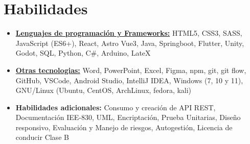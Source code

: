 \documentclass[11pt,a4paper,sans]{moderncv}
\newcommand{\sectionMargin}{-3mm}
\begin{document}
\section{Habilidades}{
    \begin{itemize}[label=\textbullet, noitemsep]
        \item {\underline{\textbf{Lenguajes de programación y Frameworks:}}
            {HTML5},
            {CSS3},
            {SASS},
            {JavaScript (ES6+)},
            {React},
            {Astro}
            {Vue3},
            {Java},
            {Springboot},
            {Flutter},
            {Unity},
            {Godot},
            {SQL},
            {Python},
            {C\#},
            {Arduino},
            {LateX}
        }
        
        \item {\underline{\textbf{Otras tecnologias:}}
            {Word},
            {PowerPoint},
            {Excel}, 
            {Figma},
            {npm},
            {git},
            {git flow},
            {GitHub},
            {VSCode},
            {Android Studio},
            {IntelliJ IDEA},
            {Windows} (7, 10 y 11),
            {GNU/Linux} (Ubuntu, CentOS, ArchLinux, fedora, kali)
        }
        \item {\textbf{Habilidades adicionales:} 
            Consumo y creación de {API REST},
            {Documentación IEE-830},
            {UML},
            {Encriptación},
            {Prueba Unitarias},
            {Diseño responsivo},
            Evaluación y {Manejo de riesgos},  
            {Autogestión}, 
            Licencia de conducir {Clase B}
        }
    \end{itemize}
}

\vspace*{\sectionMargin}
\end{document}
